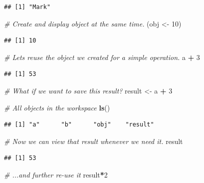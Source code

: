 \documentclass[
]{book}
\newenvironment{Shaded}{\begin{snugshade}}{\end{snugshade}}
\newcommand{\CommentTok}[1]{\textcolor[rgb]{0.56,0.35,0.01}{\textit{#1}}}
\newcommand{\DecValTok}[1]{\textcolor[rgb]{0.00,0.00,0.81}{#1}}
\newcommand{\FunctionTok}[1]{\textcolor[rgb]{0.13,0.29,0.53}{\textbf{#1}}}
\newcommand{\NormalTok}[1]{#1}
\newcommand{\OtherTok}[1]{\textcolor[rgb]{0.56,0.35,0.01}{#1}}
\newcommand{\SpecialCharTok}[1]{\textcolor[rgb]{0.81,0.36,0.00}{\textbf{#1}}}
\begin{document}
\begin{verbatim}
## [1] "Mark"
\end{verbatim}

\begin{Shaded}
\begin{Highlighting}[]
\CommentTok{\# Create and display object at the same time.}
\NormalTok{(obj }\OtherTok{\textless{}{-}} \DecValTok{10}\NormalTok{)}
\end{Highlighting}
\end{Shaded}

\begin{verbatim}
## [1] 10
\end{verbatim}

\begin{Shaded}
\begin{Highlighting}[]
\CommentTok{\# Let\textquotesingle{}s reuse the object we created for a simple operation.}
\NormalTok{a }\SpecialCharTok{+} \DecValTok{3}
\end{Highlighting}
\end{Shaded}

\begin{verbatim}
## [1] 53
\end{verbatim}

\begin{Shaded}
\begin{Highlighting}[]
\CommentTok{\# What if we want to save this result?}
\NormalTok{result }\OtherTok{\textless{}{-}}\NormalTok{ a }\SpecialCharTok{+} \DecValTok{3}

\CommentTok{\# All objects in the workspace}
\FunctionTok{ls}\NormalTok{()}
\end{Highlighting}
\end{Shaded}

\begin{verbatim}
## [1] "a"      "b"      "obj"    "result"
\end{verbatim}

\begin{Shaded}
\begin{Highlighting}[]
\CommentTok{\# Now we can view that result whenever we need it.}
\NormalTok{result}
\end{Highlighting}
\end{Shaded}

\begin{verbatim}
## [1] 53
\end{verbatim}

\begin{Shaded}
\begin{Highlighting}[]
\CommentTok{\# ...and further re{-}use it}
\NormalTok{result}\SpecialCharTok{*}\DecValTok{2}
\end{Highlighting}
\end{Shaded}
\end{document}
